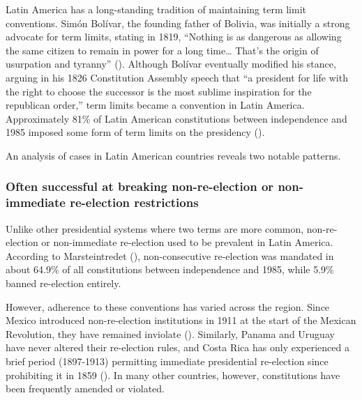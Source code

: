 \documentclass[
  12pt,
]{report}
\begin{document}
Latin America has a long-standing tradition of maintaining term limit
conventions. Simón Bolívar, the founding father of Bolivia, was
initially a strong advocate for term limits, stating in 1819, ``Nothing
is as dangerous as allowing the same citizen to remain in power for a
long time\ldots{} That's the origin of usurpation and tyranny''
(). Although
Bolívar eventually modified his stance, arguing in his 1826 Constitution
Assembly speech that ``a president for life with the right to choose the
successor is the most sublime inspiration for the republican order,''
term limits became a convention in Latin America. Approximately 81\% of
Latin American constitutions between independence and 1985 imposed some
form of term limits on the presidency
().

An analysis of cases in Latin American countries reveals two notable
patterns.

\subsubsection*{Often successful at breaking non-re-election or
non-immediate re-election
restrictions}\label{often-successful-at-breaking-non-re-election-or-non-immediate-re-election-restrictions}

Unlike other presidential systems where two terms are more common,
non-re-election or non-immediate re-election used to be prevalent in
Latin America. According to Marsteintredet
(), non-consecutive re-election
was mandated in about 64.9\% of all constitutions between independence
and 1985, while 5.9\% banned re-election entirely.

However, adherence to these conventions has varied across the region.
Since Mexico introduced non-re-election institutions in 1911 at the
start of the Mexican Revolution, they have remained inviolate
(). Similarly, Panama and
Uruguay have never altered their re-election rules, and Costa Rica has
only experienced a brief period (1897-1913) permitting immediate
presidential re-election since prohibiting it in 1859
(). In many other
countries, however, constitutions have been frequently amended or
violated.
\end{document}
